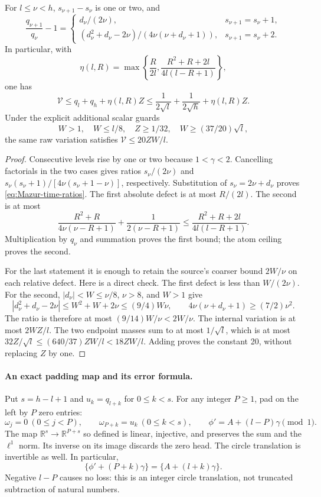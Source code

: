 \begin{proposition}
\label{prop:Mazur-raw-variation}
For $l\le\nu<h$, $s_{\nu+1}-s_\nu$ is one or two, and
\begin{equation}
 \frac{q_{\nu+1}}{q_\nu}-1=
 \begin{cases}
  d_\nu/(2\nu),&s_{\nu+1}=s_\nu+1,\\[2mm]
  (d_\nu^2+d_\nu-2\nu)/(4\nu(\nu+d_\nu+1)),
       &s_{\nu+1}=s_\nu+2 .
 \end{cases}
 \label{eq:Mazur-time-ratios}
\end{equation}
In particular, with
\[
 \eta(l,R)=\max\left\{\frac R{2l},
       \frac{R^2+R+2l}{4l(l-R+1)}\right\},
\]
one has
\begin{equation}
 \mathcal V\le q_l+q_h+\eta(l,R)Z
 \le\frac1{2\sqrt l}+\frac1{2\sqrt h}+\eta(l,R)Z .
 \label{eq:Mazur-raw-variation}
\end{equation}
Under the explicit additional scalar guards
\[
 W>1,\quad W\le l/8,\quad Z\ge1/32,\quad
 W\ge(37/20)\sqrt l ,
\]
the same raw variation satisfies $\mathcal V\le20ZW/l$.
\end{proposition}
\begin{proof}
Consecutive levels rise by one or two because $1<\gamma<2$.
Cancelling factorials in the two cases gives ratios
$s_\nu/(2\nu)$ and
$s_\nu(s_\nu+1)/[4\nu(s_\nu+1-\nu)]$, respectively.
Substitution of $s_\nu=2\nu+d_\nu$ proves
\eqref{eq:Mazur-time-ratios}.
The first absolute defect is at most $R/(2l)$.
The second is at most
\[
 \frac{R^2+R}{4\nu(\nu-R+1)}
       +\frac1{2(\nu-R+1)}\le
 \frac{R^2+R+2l}{4l(l-R+1)}.
\]
Multiplication by $q_\nu$ and summation proves the first bound;
the atom ceiling proves the second.

For the last statement it is enough to retain the source's
coarser bound $2W/\nu$ on each relative defect.
Here is a direct check. The first defect is less than $W/(2\nu)$.
For the second, $|d_\nu|<W\le\nu/8$, $\nu>8$, and $W>1$
give
\[
 |d_\nu^2+d_\nu-2\nu|
 \le W^2+W+2\nu\le(9/4)W\nu,\qquad
 4\nu(\nu+d_\nu+1)\ge(7/2)\nu^2 .
\]
The ratio is therefore at most $(9/14)W/\nu<2W/\nu$.
The internal variation is at most $2WZ/l$.
The two endpoint masses sum to at most $1/\sqrt l$,
which is at most $32Z/\sqrt l\le(640/37)ZW/l<18ZW/l$.
Adding proves the constant 20, without replacing $Z$ by one.
\end{proof}

\paragraph{An exact padding map and its error formula.}
Put $s=h-l+1$ and $u_k=q_{l+k}$ for $0\le k<s$.
For any integer $P\ge1$, pad on the left by $P$ zero entries:
\[
 \omega_j=0\ (0\le j<P),\qquad
 \omega_{P+k}=u_k\ (0\le k<s),\qquad
 \phi'=A+(l-P)\gamma\pmod1 .
\]
The map $\mathbb R^s\to\mathbb R^{P+s}$ so defined is linear,
injective, and preserves the sum and the $\ell^1$ norm.
Its inverse on its image discards the zero head.
The circle translation is invertible as well. In particular,
\[
 \{\phi'+(P+k)\gamma\}=\{A+(l+k)\gamma\}.
\]
Negative $l-P$ causes no loss: this is an integer circle translation,
not truncated subtraction of natural numbers.

